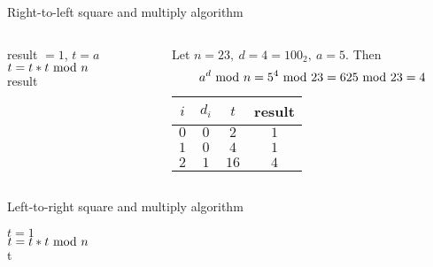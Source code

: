 \begin{frame}{Right-to-left square and multiply algorithm}
\begin{columns}[T] %
\begin{column}{.4\textwidth}
{
\setlength{\interspacetitleruled}{0pt}%
\setlength{\algotitleheightrule}{0pt}%
\begin{algorithm}[H]
result $= 1$, $t = a$\\
 	{
  		$t=t*t\textrm{~mod~} n$\\
  	}
  	\Return result
\end{algorithm}
}
\end{column}%
\hfill%
\begin{column}{.6\textwidth}
\begin{example}
    Let $n=23,\ d=4=100_2,\  a=5$.
    Then 
    \[
    a^d\textrm{~mod~} n=5^4\textrm{~mod~}23=625\textrm{~mod~}23=4
    \]
 \begin{center}
        \begin{tabular}{c|c|c|c}
     $i$ & $d_i$  &  $t$  & result\\\hline
     $0$ & $0$    &  $2$  &  $1$ \\
     $1$ & $0$    &  $4$  &  $1$ \\
     $2$ & $1$    &  $16$  &  $4$ \\
    \end{tabular}
    \end{center}
\end{example}
\end{column}%
\end{columns}
\end{frame}

\begin{frame}{Left-to-right square and multiply algorithm}
    \begin{algorithm}[H]
$t = 1$\\
 	{
  	$t=t*t\textrm{~mod~} n$\\
  	}
  	\Return t
\caption{Left-to-right square and multiply algorithm for computing modular exponentiation.}
\end{algorithm}
\end{frame}

